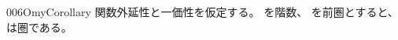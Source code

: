 \documentclass[index]{subfiles}
\begin{document}
\begin{myBlock}{006O}{myCorollary}
  関数外延性と一価性を仮定する。
  を階数、
  を前圏とすると、
  は圏である。\myQed
\end{myBlock}
\end{document}
